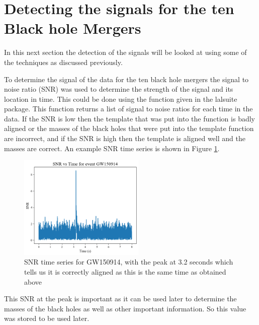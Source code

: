 \documentclass[]{article}
\begin{document}
\section*{Detecting the signals for the ten Black hole Mergers}
In this next section the detection of the signals will be looked at using some of the
techniques as discussed previously.

To determine the signal of the data for the ten black hole mergers the signal
to noise ratio (SNR) was used to determine the strength of the signal and its location in time.
This could be done using the function given in the lalsuite package. This function
returns a list of signal to noise ratios for each time in the data. If the SNR is low then the
template that was put into the function is badly aligned or the masses of the black holes
that were put into the template function are incorrect, and if the SNR is high
then the template is aligned well and the masses are correct. An example SNR time series
is shown in Figure \ref{fig:SNR}.
\begin{figure}[h]
    \includegraphics[width=6cm]{images/SNR_gw150914.png}
    \caption{SNR time series for GW150914, with the peak at 3.2 seconds which tells
    us it is correctly aligned as this is the same time as obtained above}
    \label{fig:SNR}
\end{figure}
This SNR at the peak is important as it can be used later to determine the masses of the
black holes as well as other important information. So this value was stored to be used later.
\end{document}
